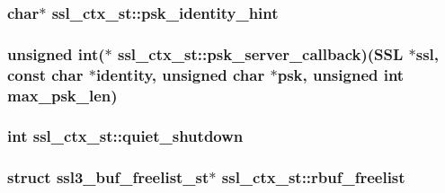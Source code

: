 \hypertarget{structssl__ctx__st_a8834b3e8d91529f7339f8648d20a884b}{
\subsubsection[{psk\-\_\-identity\-\_\-hint}]{\setlength{\rightskip}{0pt plus 5cm}char$\ast$ ssl\-\_\-ctx\-\_\-st\-::psk\-\_\-identity\-\_\-hint}}\label{structssl__ctx__st_a8834b3e8d91529f7339f8648d20a884b}
\hypertarget{structssl__ctx__st_ac6e3c5a91b3fd81cf675ca61b091ebac}{
\subsubsection[{psk\-\_\-server\-\_\-callback}]{\setlength{\rightskip}{0pt plus 5cm}unsigned int($\ast$ ssl\-\_\-ctx\-\_\-st\-::psk\-\_\-server\-\_\-callback)(S\-S\-L $\ast$ssl, const char $\ast$identity, unsigned char $\ast$psk, unsigned int max\-\_\-psk\-\_\-len)}}\label{structssl__ctx__st_ac6e3c5a91b3fd81cf675ca61b091ebac}
\hypertarget{structssl__ctx__st_a325f28f265dae1b20da7c813e41bdb96}{
\subsubsection[{quiet\-\_\-shutdown}]{\setlength{\rightskip}{0pt plus 5cm}int ssl\-\_\-ctx\-\_\-st\-::quiet\-\_\-shutdown}}\label{structssl__ctx__st_a325f28f265dae1b20da7c813e41bdb96}
\hypertarget{structssl__ctx__st_a5e371436a68dffc99cab280da6b8f65b}{
\subsubsection[{rbuf\-\_\-freelist}]{\setlength{\rightskip}{0pt plus 5cm}struct {\bf ssl3\-\_\-buf\-\_\-freelist\-\_\-st}$\ast$ ssl\-\_\-ctx\-\_\-st\-::rbuf\-\_\-freelist}}\label{structssl__ctx__st_a5e371436a68dffc99cab280da6b8f65b}
